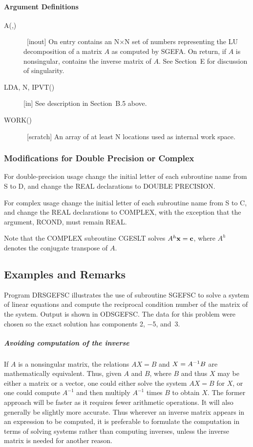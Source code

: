 \documentclass[twoside]{MATH77}
\begin{document}
\paragraph{Argument Definitions}

\begin{description}
\item[A(,)] \ [inout] On entry contains an N$\times $N set of numbers representing
the LU decomposition of a matrix $A$ as computed by SGEFA. On return, if $A$ is
nonsingular, contains the inverse matrix of $A$. See Section~E for
discussion of singularity.

\item[LDA, N, IPVT()] [in] See description in Section~B.5 above.

\item[WORK()] \ [scratch] An array of at least N locations used as internal work
space.
\end{description}

\subsubsection{Modifications for Double Precision or Complex}

For double-precision usage change the initial letter of each subroutine name
from S to D, and change the REAL declarations to DOUBLE PRECISION.

For complex usage change the initial letter of each subroutine name from S
to C, and change the REAL declarations to COMPLEX, with the exception that
the argument, RCOND, must remain REAL.

Note that the COMPLEX subroutine CGESLT solves $A^h{\bf x} = {\bf c}$, where $A^h$
denotes the conjugate transpose of $A$.

\subsection{Examples and Remarks}

Program DRSGEFSC illustrates the use of subroutine SGEFSC to solve a system
of linear equations and compute the reciprocal condition number of the
matrix of the system. Output is shown in ODSGEFSC. The data for this problem
were chosen so the exact solution has components 2, $-$5, and~3.

\subparagraph{Avoiding computation of the inverse}

If $A$ is a nonsingular matrix, the relations $AX = B$ and $X = A^{%
-1}B$ are mathematically equivalent. Thus, given $A$ and $B$,
where $B$ and thus $X$ may be either a matrix or a vector, one could either
solve the system $AX = B$ for $X$, or one could compute $A^{-1}$
and then multiply $A^{-1}$ times $B$ to obtain $X$. The
former approach will be faster as it requires fewer arithmetic operations.
It will also generally be slightly more accurate. Thus wherever an inverse
matrix appears in an expression to be computed, it is preferable to
formulate the computation in terms of solving systems rather than computing
inverses, unless the inverse matrix is needed for another reason.
\end{document}
